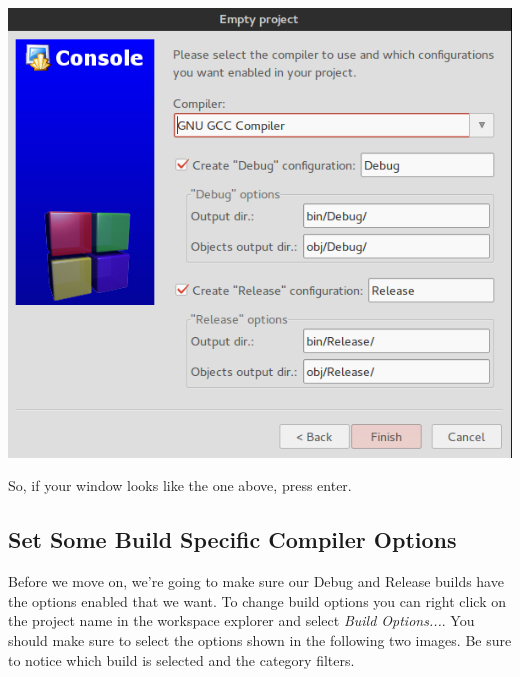 \documentclass[10pt]{article}
\begin{document}
\vspace{.1in}
\begin{center}
\includegraphics[scale=.5]{CB_EmptyProjectBuilds.png}
\end{center}
\vspace{.1in}

So, if your window looks like the one above, press enter. 

\subsection{Set Some Build Specific Compiler Options}

Before we move on, we're going to make sure our Debug and Release builds have the options enabled that we want. To change build options you can right click on the project name in the workspace explorer and select \textit{Build Options...}. You should make sure to select the options shown in the following two images. Be sure to notice which build is selected and the category filters.
\end{document}
